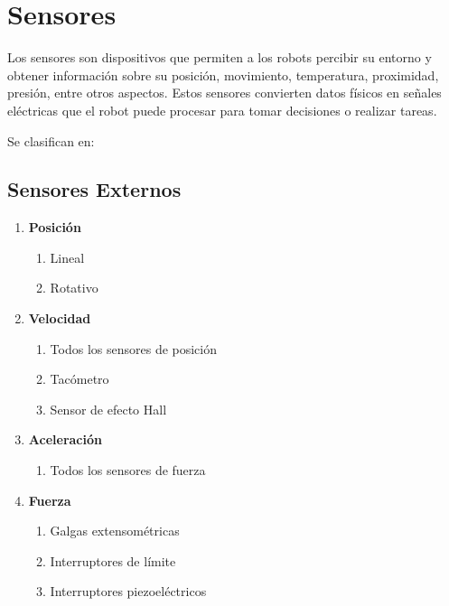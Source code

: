 \section{Sensores}
Los sensores son dispositivos que permiten a los robots percibir su entorno y obtener información sobre su posición, movimiento, temperatura, proximidad, presión, entre otros aspectos. Estos sensores convierten datos físicos en señales eléctricas que el robot puede procesar para tomar decisiones o realizar tareas.

Se clasifican en:

	\subsection{Sensores Externos}
		\begin{enumerate}
			\item \textbf{Posición}
			\begin{enumerate}
				\item Lineal
				\item Rotativo
			\end{enumerate}
			
			\item \textbf{Velocidad}
			\begin{enumerate}
				\item Todos los sensores de posición
				\item Tacómetro
				\item Sensor de efecto Hall
			\end{enumerate}
			
			\item \textbf{Aceleración}
			\begin{enumerate}
				\item Todos los sensores de fuerza
			\end{enumerate}
			
			\item \textbf{Fuerza}
			\begin{enumerate}
				\item Galgas extensométricas
				\item Interruptores de límite
				\item Interruptores piezoeléctricos
			\end{enumerate}
		\end{enumerate}
		
